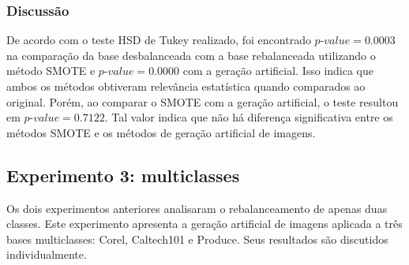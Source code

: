 
\subsubsection{Discussão}

De acordo com o teste HSD de Tukey realizado, foi encontrado $\textit{p-value} = 0.0003$ na comparação da base desbalanceada com a base rebalanceada utilizando o método SMOTE e $\textit{p-value} = 0.0000$ com a geração artificial. Isso indica que ambos os métodos obtiveram relevância estatística quando comparados ao original. Porém, ao comparar o SMOTE com a geração artificial, o teste resultou em $\textit{p-value} = 0.7122$. Tal valor indica que não há diferença significativa entre os métodos SMOTE e os métodos de geração artificial de imagens.



\FloatBarrier
\subsection{Experimento 3: multiclasses}

Os dois experimentos anteriores analisaram o rebalanceamento de apenas duas classes. Este experimento apresenta a geração artificial de imagens aplicada a três bases multiclasses: Corel, Caltech101 e Produce. Seus resultados são discutidos individualmente.

